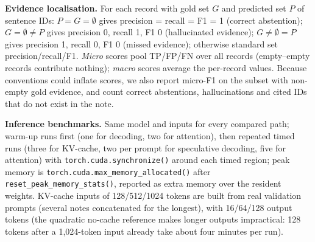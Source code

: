 \textbf{Evidence localisation.} For each record with gold set $G$ and predicted set $P$ of sentence IDs:
$P{=}G{=}\emptyset$ gives precision = recall = F1 = 1 (correct abstention); $G{=}\emptyset\neq P$ gives
precision 0, recall 1, F1 0 (hallucinated evidence); $G\neq\emptyset{=}P$ gives precision 1, recall 0, F1 0
(missed evidence); otherwise standard set precision/recall/F1. \emph{Micro} scores pool TP/FP/FN over all
records (empty--empty records contribute nothing); \emph{macro} scores average the per-record values. Because
conventions could inflate scores, we also report micro-F1 on the subset with non-empty gold evidence, and
count correct abstentions, hallucinations and cited IDs that do not exist in the note.

\textbf{Inference benchmarks.} Same model and inputs for every compared path; warm-up runs first (one for
decoding, two for attention), then repeated timed runs (three for KV-cache, two per prompt for speculative
decoding, five for attention) with \texttt{torch.cuda.synchronize()} around each timed region;
peak memory is \texttt{torch.cuda.max\_memory\_allocated()} after \texttt{reset\_peak\_memory\_stats()},
reported as extra memory over the resident weights. KV-cache inputs of 128/512/1024 tokens are built from real
validation prompts (several notes concatenated for the longest), with 16/64/128 output tokens (the quadratic no-cache reference makes longer outputs impractical: 128 tokens after a 1{,}024-token input already take about four minutes per run).
